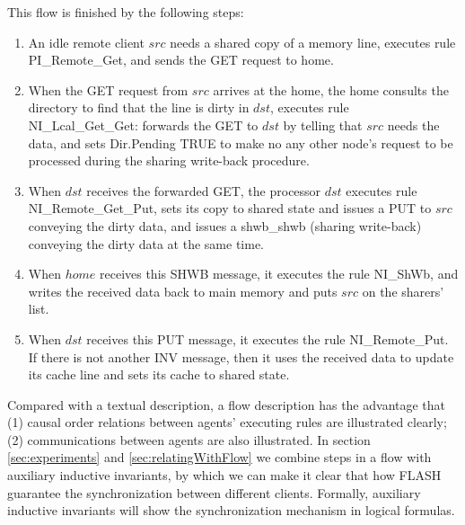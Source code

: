 \documentclass{llncs}
\begin{document}
This flow is finished by the following steps:
\begin{enumerate}
\item An idle remote  client $src$ needs a shared copy of a memory line, executes   rule PI\_Remote\_Get, and  sends the GET request to home.

\item  When the GET request from $src$ arrives at the
home, the home consults the directory to find that the line is dirty in $dst$,  executes rule NI\_Lcal\_Get\_Get: forwards the GET to $dst$ by telling that $src$ needs the data, and sets Dir.Pending TRUE to make no any other node's request to be processed during the sharing write-back procedure.

\item  When $dst$ receives the forwarded GET, the
processor $dst$ executes rule \\
NI\_Remote\_Get\_Put, sets its copy to shared state and issues a PUT to $src$ conveying the dirty data,  and  issues a   shwb\_shwb
 (sharing write-back) conveying the dirty data at the same time.

\item   When $home$ receives this SHWB message, it executes the rule NI\_ShWb, and
 writes the received
data back to main memory and puts $src$ on the sharers' list.

\item When $dst$ receives this PUT message, it executes the rule NI\_Remote\_Put. If there is not another INV message, then it   uses the received data to update its cache line and sets its cache to shared state.


\end{enumerate}

Compared with a textual description, a flow description has the advantage that (1) causal order relations between agents' executing rules are illustrated clearly; (2) communications between agents are also illustrated. In section \ref{sec:experiments} and \ref{sec:relatingWithFlow} we combine steps in a flow with auxiliary inductive invariants, by which we can make it clear that how  FLASH guarantee the synchronization between different clients. Formally, auxiliary inductive invariants will show    the synchronization mechanism in logical formulas.

\end{document}
